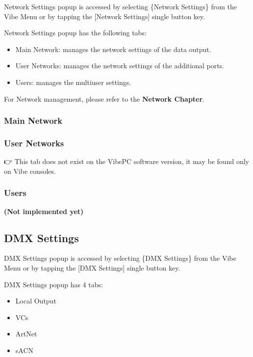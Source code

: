 \documentclass[
]{article}
\begin{document}
Network Settings popup is accessed by selecting \{Network Settings\} from the Vibe Menu or by tapping the {[}Network Settings{]} single button key.

Network Settings popup has the following tabs:

\begin{itemize}
\item
  Main Network: manages the network settings of the data output.
\item
  User Networks: manages the network settings of the additional ports.
\item
  Users: manages the multiuser settings.
\end{itemize}

For Network management, please refer to the \textbf{Network Chapter}.

\hypertarget{main-network}{%
\subsubsection{Main Network}\label{main-network}}

\hypertarget{user-networks}{%
\subsubsection{User Networks}\label{user-networks}}

👉 This tab does not exist on the VibePC software version, it may be found only on Vibe consoles.

\hypertarget{users}{%
\subsubsection{Users}\label{users}}

{ \textbf{(Not implemented yet)} }

\hypertarget{DMX-Settings-4.3}{%
\subsection{DMX Settings}\label{DMX-Settings-4.3}}

DMX Settings popup is accessed by selecting \{DMX Settings\} from the Vibe Menu or by tapping the {[}DMX Settings{]} single button key.

DMX Settings popup has 4 tabs:

\begin{itemize}
\item
  Local Output
\item
  VCs
\item
  ArtNet
\item
  sACN
\end{itemize}
\end{document}
